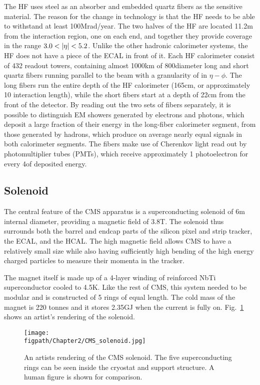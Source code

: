 The HF uses steel as an absorber and embedded quartz fibers as the sensitive material.
The reason for the change in technology is that the HF needs to be able to withstand at least 100\unit{Mrad/year}.
The two halves of the HF are located 11.2\unit{m} from the interaction region, one on each end, and together they provide coverage in the range $3.0<\lvert \eta \rvert<5.2$.
Unlike the other hadronic calorimeter systems, the HF does not have a piece of the ECAL in front of it.
Each HF calorimeter consist of 432 readout towers, containing almost 1000\unit{km} of 800\mum diameter long and short quartz fibers running parallel to the beam with a granularity of  in $\eta-\phi$.
The long fibers run the entire depth of the HF calorimeter (165\unit{cm}, or approximately 10 interaction length), while the short fibers start at a depth of 22\unit{cm} from the front of the detector.
By reading out the two sets of fibers separately, it is possible to distinguish EM showers generated by electrons and photons, which deposit a large fraction of their energy in the long-fiber calorimeter segment, from those generated by hadrons, which produce on average nearly equal signals in both calorimeter segments.
The fibers make use of Cherenkov light read out by photomultiplier tubes (PMTs), which receive approximately 1 photoelectron for every 4\gev of deposited energy.

\subsection{Solenoid}

The central feature of the CMS apparatus is a superconducting solenoid of 6\unit{m} internal diameter, providing a magnetic field of 3.8\unit{T}.
The solenoid thus surrounds both the barrel and endcap parts of the silicon pixel and strip tracker, the ECAL, and the HCAL.
The high magnetic field allows CMS to have a relatively small size while also having sufficiently high bending of the high energy charged particles to measure their momenta in the tracker.

The magnet itself is made up of a 4-layer winding of reinforced NbTi superconductor cooled to 4.5\unit{K}.
Like the rest of CMS, this system needed to be modular and is constructed of 5 rings of equal length.
The cold mass of the magnet is 220 tonnes and it stores 2.35\unit{GJ} when the current is fully on.
Fig.~\ref{fig:CMS_solenoid} shows an artist's rendering of the solenoid.

\begin{figure}[!hbt]
	\centering
	\texttt{[image: \\figpath/Chapter2/CMS\_solenoid.jpg]}
	\caption{An artists rendering of the CMS solenoid. The five superconducting rings can be seen inside the cryostat and support structure. A human figure is shown for comparison.}
	\label{fig:CMS_solenoid}
\end{figure}

